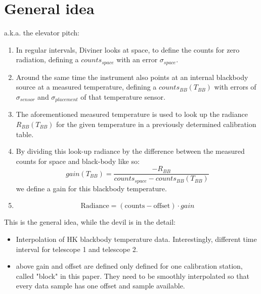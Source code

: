 \section{General idea}
a.k.a. the elevator pitch:

\begin{enumerate}
\item In regular intervals, Diviner looks at space, to define the counts for zero radiation, defining a $counts_{space}$ with an error $\sigma_{space}$. 
\item Around the same time the instrument also points at an internal blackbody source at a measured temperature, defining a $counts_{BB}\left(T_{BB}\right)$ with errors of $\sigma_{sensor}$ and $\sigma_{placement}$ of that temperature sensor.
\item The aforementioned measured temperature is used to look up the radiance $R_{BB}\left(T_{BB}\right)$ for the given temperature in a previously determined calibration table.
\item By dividing this look-up radiance by the difference between the measured counts for space and black-body like so: $$ gain\left(T_{BB}\right) = \frac{-R_{BB}}{counts_{space} - counts_{BB}\left(T_{BB}\right)} $$ we define a gain for this blackbody temperature.
\item $$ \mathrm{Radiance} = \left(\mathrm{counts} - \mathrm{offset}\right) \cdot gain $$
\end{enumerate}

This is the general idea, while the devil is in the detail:
\begin{itemize}
\item Interpolation of HK blackbody temperature data. Interestingly, different time interval for telescope 1 and telescope 2.
\item above gain and offset are defined only defined for one calibration station, called "block" in this paper. They need to be smoothly interpolated so that every data sample has one offset and sample available.
\end{itemize}